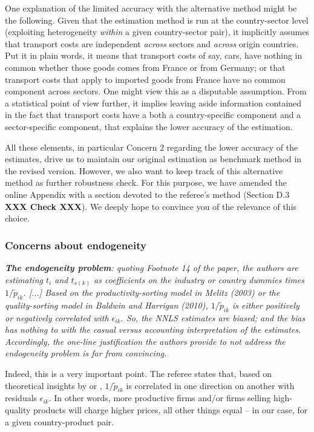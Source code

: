 \documentclass[a4paper,11pt]{article}
\begin{document}
\begin{itemize}
One explanation of the limited accuracy with the alternative method might be the following. Given that the estimation method is run at the country-sector level (exploiting heterogeneity \textit{within} a given country-sector pair), it implicitly assumes that transport costs are independent \textit{across} sectors and \textit{across} origin countries. Put it in plain words, it means that transport costs of say, cars, have nothing in common whether those goods comes from France or from Germany; or that transport costs that apply to imported goods from France have no common component across sectors. One might view this as a disputable assumption. From a statistical point of view further, it implies leaving aside information contained in the fact that transport costs have a both a country-specific component and a sector-specific component, that explains the lower accuracy of the estimation.


\end{itemize}

All these elements, in particular Concern 2 regarding the lower accuracy of the estimates, drive us to maintain our original estimation as benchmark method in the revised version. However, we also want to keep track of this alternative method as further robustness check. For this purpose, we have amended the online Appendix with a section devoted to the referee's method (Section D.3 \textbf{XXX Check XXX}). We deeply hope to convince you of the relevance of this choice.



\subsubsection{Concerns about endogeneity}

\textit{\textbf{The endogeneity problem}: quoting Footnote 14 of the paper, the authors
are estimating $t_i$ and $t_{s(k)}$ as coefficients on the industry or country
dummies times $1/\widetilde{p}_{ik}$. [...] Based on the productivity-sorting model in Melitz (2003) or the quality-sorting
model in Baldwin and Harrigan (2010),  $1/\widetilde{p}_{ik}$ is either positively
or negatively correlated with $\epsilon_{ik}$. So, the NNLS estimates are biased; and
the bias has nothing to with the casual versus accounting interpretation of
the estimates. Accordingly, the one-line justification the authors provide
to not address the endogeneity problem is far from convincing.}

Indeed, this is a very important point. The referee states that, based on theoretical insights by \citet{melitz} or \citet{baldwin_harrigan}, $1/\widetilde{p}_{ik}$ is correlated in one direction on another with residuals $\epsilon_{ik}$. In other words, more productive firms and/or firms selling high-quality products will charge higher prices, all other things equal – in our case, for a given country-product pair.
\end{document}

